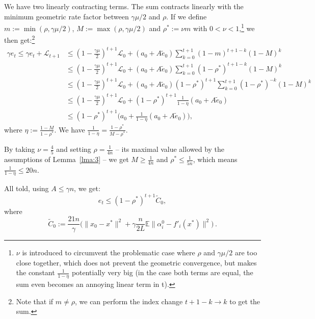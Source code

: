 \documentclass[twoside]{article}
\newcommand{\stepsize}{\gamma}
\newcommand{\strongconvex}{\mu}
\newcommand{\contraction}{\rho}
\newcommand{\lyapunov}{\mathcal{L}}
\newcommand{\E}{\mathbb{E}}
\begin{document}
We have two linearly contracting terms. 
The sum contracts linearly with the minimum geometric rate factor between $\stepsize \strongconvex / 2$ and $\contraction$. 
If we define $m := \min(\contraction, \stepsize\strongconvex/2)$, $M := \max(\contraction, \stepsize\strongconvex/2)$ and $\contraction^* := \nu m$ with $0 <\nu < 1$,\footnote{$\nu$ is introduced to circumvent the problematic case where $\contraction$ and $\stepsize \strongconvex / 2$ are too close together, which does not prevent the geometric convergence, but makes the constant $\frac{1}{1-\eta}$ potentially very big (in the case both terms are equal, the sum even becomes an annoying linear term in t).} we then get:\footnote{Note that if $m \neq \contraction$, we can perform the index change $t+1-k \rightarrow k$ to get the sum.}
\begin{align}
\stepsize e_t \leq 
\stepsize e_t + \lyapunov_{t+1} 
&\leq (1-\frac{\stepsize\strongconvex}{2})^{t+1}\lyapunov_0 + (a_0 + A \tilde e_0) \sum_{k=0}^{t+1} (1 - m)^{t+1-k} (1-M)^k
\nonumber \\
&\leq (1-\frac{\stepsize\strongconvex}{2})^{t+1}\lyapunov_0 + (a_0 + A \tilde e_0) \sum_{k=0}^{t+1} (1 - \contraction^*)^{t+1-k} (1-M)^k
\nonumber \\
&\leq (1-\frac{\stepsize\strongconvex}{2})^{t+1}\lyapunov_0 + (a_0 + A \tilde e_0) (1 - \contraction^*)^{t+1} \sum_{k=0}^{t+1} (1 - \contraction^*)^{-k} (1-M)^k
\nonumber \\
&\leq (1-\frac{\stepsize\strongconvex}{2})^{t+1}\lyapunov_0 + (1 - \contraction^*)^{t+1} \frac{1}{1 -\eta} (a_0 + A \tilde e_0)
\nonumber \\
&\leq (1 - \contraction^*)^{t+1} \big(a_0 + \frac{1}{1 -\eta} (a_0 + A \tilde e_0) \big) ,
\end{align}
where $\eta := \frac{1-M}{1-\contraction^*}$. 
We have $\frac{1}{1 - \eta} = \frac{1 - \contraction^*}{M - \contraction^*}$.

By taking $\nu = \frac{4}{5}$ and setting $\contraction = \frac{1}{4n}$ -- its maximal value allowed by the assumptions of Lemma~\ref{lma:3} -- we get $M \geq \frac{1}{4n}$ and $\contraction^* \leq \frac{1}{5n}$, which means $\frac{1}{1 - \eta} \leq 20n$.

All told, using $A \leq \stepsize n$, we get:
\begin{equation}
e_t \leq (1 - \contraction^*)^{t+1} \tilde C_0,
\end{equation}
where
\begin{equation}
\tilde C_0 := \frac{21n}{\stepsize}\Big(\|x_0 - x^*\|^2 + \stepsize \frac{n}{2L}\E\|\alpha_i^0 - f'_i(x^*)\|^2 \Big) \, .
\end{equation}
\end{document}

